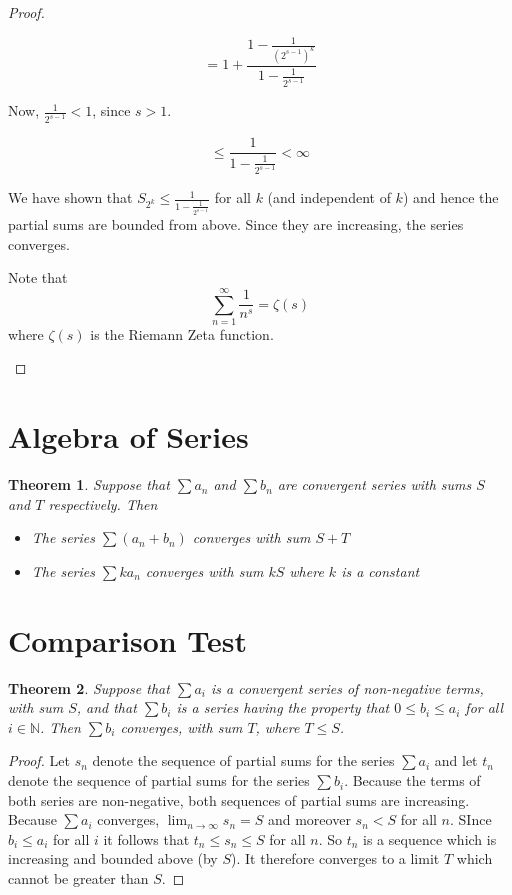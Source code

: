 \documentclass[12pt]{scrbook}
\newtheorem{theorem}{Theorem}[section]
\begin{document}
\begin{proof}
\begin{enumerate}
\[ = 1 + \frac{1 - \frac{1}{(2^{s-1})^k} } {1 - \frac{1}{2^{s-1}} } \]

Now, $\frac{1}{2^{s-1}} < 1$, since $s > 1$.

\[ \le \frac{1}{1 - \frac{1}{2^{s-1}}}  < \infty \]

We have shown that $S_{2^k} \le \frac{1}{1 - \frac{1}{2^{s-1}}}$ for all $k$ (and independent of $k$) and hence the partial sums are bounded from above.  Since they are increasing, the series converges.

Note that 
\[ \sum_{n=1}^{\infty} \frac{1}{n^s} = \zeta(s) \]
where $\zeta(s)$ is the Riemann Zeta function.

\end{enumerate}  

\end{proof}

\section{Algebra of Series}
\begin{theorem}
\label{series-algebra}
Suppose that $\sum a_n$ and $\sum b_n$ are convergent series with sums $S$ and $T$ respectively.  Then
\begin{itemize}
\item The series $\sum (a_n + b_n)$ converges with sum $S + T$
\item The series $\sum ka_n$ converges with sum $kS$ where $k$ is a constant
\end{itemize}
\end{theorem}

\section{Comparison Test}
\begin{theorem}
\label{comparison}
Suppose that $\sum a_i$ is a convergent series of non-negative terms, with sum $S$, and that $\sum b_i$ is a series
having the property that $0 \le b_i \le a_i$ for all $i \in \mathbb{N}$. Then $\sum b_i$ converges, with sum $T$, 
where $T \le S$.
\end{theorem}

\begin{proof}
Let $s_n$ denote the sequence of partial sums for the series $\sum a_i$ and let $t_n$ denote the sequence of partial 
sums for the series $\sum b_i$.  Because the terms of both series are non-negative, both sequences of partial sums
are increasing.  Because  $\sum a_i$ converges, $\lim_{n \to \infty} s_n = S$ and moreover $s_n < S$ for all $n$. 
SInce $b_i \le a_i$ for all $i$ it follows that $t_n \le s_n \le S$ for all $n$.  So $t_n$ is a sequence which is increasing
and bounded above (by $S$).  It therefore converges to a limit $T$ which cannot be greater than $S$.
\end{proof}
\end{document}
